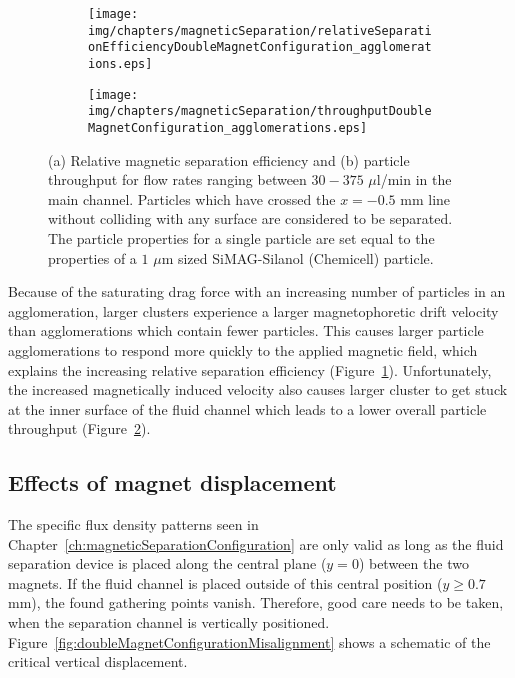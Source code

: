 \begin{figure}[htb]
        \centering
        \begin{subfigure}[b]{0.48\textwidth}
                \texttt{[image: img/chapters/magneticSeparation/relativeSeparationEfficiencyDoubleMagnetConfiguration\_agglomerations.eps]}
                \caption{}  
                \label{fig:relativeSeparationEfficiencyDoubleMagnetConfigurationAgglomerations}
        \end{subfigure}
        \begin{subfigure}[b]{0.48\textwidth}
                \texttt{[image: img/chapters/magneticSeparation/throughputDoubleMagnetConfiguration\_agglomerations.eps]}
                \caption{}       
                \label{fig:particleThroughputDoubleMagnetConfigurationAgglomerations}         
        \end{subfigure}
        \caption[Relative magnetic separation efficiency and particle throughput of particle agglomerates for different flow rates using the double magnet configuration]{(a) Relative magnetic separation efficiency and (b) particle throughput for flow rates ranging between $30 - 375$ $\mu$l/min in the main channel. Particles which have crossed the $x=-0.5$ mm line without colliding with any surface are considered to be separated. The particle properties for a single particle are set equal to the properties of a $1$ $\mu$m sized SiMAG-Silanol (Chemicell) particle.}
        \label{fig:relativeSeparationEfficiencyAndParticleThroughputDoubleMagnetConfigurationAgglomerations}
\end{figure}

Because of the saturating drag force with an increasing number of particles in an agglomeration, larger clusters experience a larger magnetophoretic drift velocity than agglomerations which contain fewer particles. This causes larger particle agglomerations to respond more quickly to the applied magnetic field, which explains the increasing relative separation efficiency (Figure~\ref{fig:relativeSeparationEfficiencyDoubleMagnetConfigurationAgglomerations}). Unfortunately, the increased magnetically induced velocity also causes larger cluster to get stuck at the inner surface of the fluid channel which leads to a lower overall particle throughput (Figure~\ref{fig:particleThroughputDoubleMagnetConfigurationAgglomerations}).

\subsection{Effects of magnet displacement}
\label{subsec:effectsOfMagnetMisalignment}
The specific flux density patterns seen in Chapter~\ref{ch:magneticSeparationConfiguration} are only valid as long as the fluid separation device is placed along the central plane ($y=0$) between the two magnets. If the fluid channel is placed outside of this central position ($y \geq 0.7$ mm), the found gathering points vanish. Therefore, good care needs to be taken, when the separation channel is vertically positioned. Figure~\ref{fig:doubleMagnetConfigurationMisalignment} shows a schematic of the critical vertical displacement.

